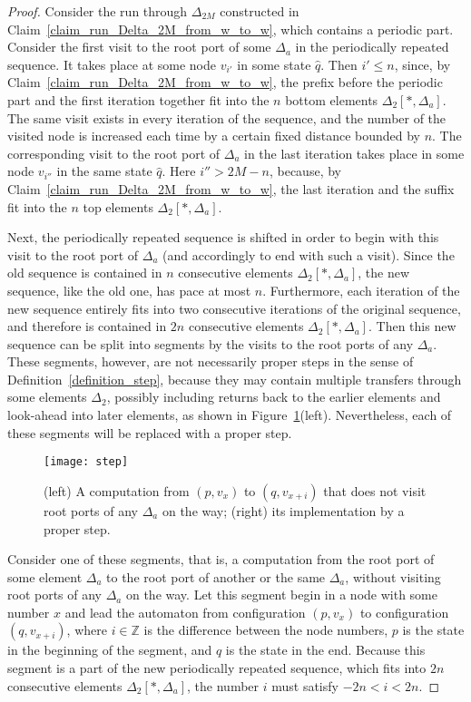 \documentclass[12pt,a4paper]{article}
\theoremstyle{definition}
\begin{document}
\begin{proof}
Consider the run through $\Delta_{2M}$
constructed in Claim~\ref{claim_run_Delta_2M_from_w_to_w},
which contains a periodic part.
Consider the first visit to the root port of some $\Delta_a$
in the periodically repeated sequence.
It takes place at some node $v_{i'}$ in some state $\widehat{q}$.
Then $i' \leqslant n$,
since, by Claim~\ref{claim_run_Delta_2M_from_w_to_w},
the prefix before the periodic part and the first iteration
together fit into the $n$ bottom elements $\Delta_2[*,\Delta_a]$.
The same visit exists in every iteration of the sequence,
and the number of the visited node is increased each time
by a certain fixed distance bounded by $n$.
The corresponding visit to the root port of $\Delta_a$ in the last iteration
takes place in some node $v_{i''}$ in the same state $\widehat{q}$.
Here $i'' > 2M-n$,
because, by Claim~\ref{claim_run_Delta_2M_from_w_to_w},
the last iteration and the suffix
fit into the $n$ top elements $\Delta_2[*,\Delta_a]$.

Next, the periodically repeated sequence is shifted
in order to begin with this visit to the root port of $\Delta_a$
(and accordingly to end with such a visit).
Since the old sequence is contained in $n$ consecutive elements $\Delta_2[*,\Delta_a]$,
the new sequence, like the old one, has pace at most $n$.
Furthermore, each iteration of the new sequence entirely fits
into two consecutive iterations of the original sequence,
and therefore is contained in $2n$ consecutive elements $\Delta_2[*,\Delta_a]$.
Then this new sequence can be split into segments
by the visits to the root ports of any $\Delta_a$.
These segments, however, are not necessarily proper steps in the sense of Definition~\ref{definition_step},
because they may contain multiple transfers through some elements $\Delta_2$,
possibly including returns back to the earlier elements and look-ahead into later elements,
as shown in Figure~\ref{f:move_i_p_q_gamma_runs}(left).
Nevertheless, each of these segments will be replaced with a proper step.

\begin{figure}[t]
	\centerline{\texttt{[image: step]}}
	\caption{(left) A computation from $(p, v_x)$ to $(q,v_{x+i})$
	that does not visit root ports of any $\Delta_a$ on the way;
	(right) its implementation by a proper step.}
	\label{f:move_i_p_q_gamma_runs}
\end{figure}

Consider one of these segments,
that is, a computation from the root port of some element $\Delta_a$
to the root port of another or the same $\Delta_a$,
without visiting root ports of any $\Delta_a$ on the way.
Let this segment begin in a node with some number $x$
and lead the automaton
from configuration $(p,v_x)$ to configuration $(q,v_{x+i})$,
where $i \in \mathbb{Z}$ is the difference between the node numbers,
$p$ is the state in the beginning of the segment,
and $q$ is the state in the end.
Because this segment is a part of the new periodically repeated sequence,
which fits into $2n$ consecutive elements $\Delta_2[*, \Delta_a]$,
the number $i$ must satisfy $-2n < i < 2n$.


\end{proof}
\end{document}
